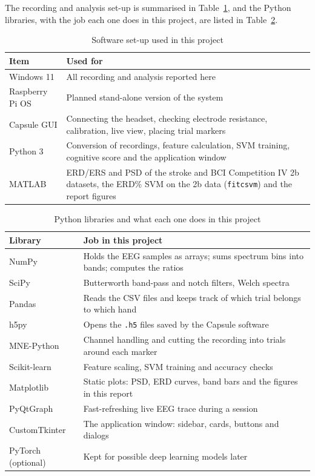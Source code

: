 The recording and analysis set-up is summarised in Table~\ref{tab:sw_setup}, and the
Python libraries, with the job each one does in this project, are listed in
Table~\ref{tab:sw_libs}.

\begin{table}[!htbp]
\centering
\caption{Software set-up used in this project}
\label{tab:sw_setup}
\begin{tabular}{|l|p{10cm}|}
\hline
\textbf{Item} & \textbf{Used for} \\
\hline
Windows 11 & All recording and analysis reported here \\
\hline
Raspberry Pi OS & Planned stand-alone version of the system \\
\hline
Capsule GUI & Connecting the headset, checking electrode resistance, calibration, live view, placing trial markers \\
\hline
Python 3 & Conversion of recordings, feature calculation, SVM training, cognitive score and the application window \\
\hline
MATLAB & ERD/ERS and PSD of the stroke and BCI Competition IV 2b datasets, the ERD\% SVM on the 2b data (\texttt{fitcsvm}) and the report figures \\
\hline
\end{tabular}
\end{table}

\begin{table}[!htbp]
\centering
\caption{Python libraries and what each one does in this project}
\label{tab:sw_libs}
\begin{tabular}{|l|p{10cm}|}
\hline
\textbf{Library} & \textbf{Job in this project} \\
\hline
NumPy & Holds the EEG samples as arrays; sums spectrum bins into bands; computes the ratios \\
\hline
SciPy & Butterworth band-pass and notch filters, Welch spectra \\
\hline
Pandas & Reads the CSV files and keeps track of which trial belongs to which hand \\
\hline
h5py & Opens the \texttt{.h5} files saved by the Capsule software \\
\hline
MNE-Python \cite{gramfort2013mne} & Channel handling and cutting the recording into trials around each marker \\
\hline
Scikit-learn \cite{pedregosa2011sklearn} & Feature scaling, SVM training and accuracy checks \\
\hline
Matplotlib & Static plots: PSD, ERD curves, band bars and the figures in this report \\
\hline
PyQtGraph & Fast-refreshing live EEG trace during a session \\
\hline
CustomTkinter & The application window: sidebar, cards, buttons and dialogs \\
\hline
PyTorch (optional) & Kept for possible deep learning models later \\
\hline
\end{tabular}
\end{table}

